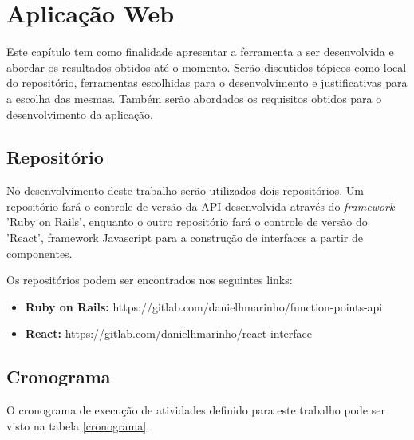 \chapter[Aplicação Web]{Aplicação Web}

Este capítulo tem como finalidade apresentar a ferramenta a ser desenvolvida e abordar os resultados obtidos até o momento. Serão discutidos tópicos como local do repositório, ferramentas escolhidas para o desenvolvimento e justificativas para a escolha das mesmas. Também serão abordados os requisitos obtidos para o desenvolvimento da aplicação.



\section{Repositório}

No desenvolvimento deste trabalho serão utilizados dois repositórios. Um repositório fará o controle de versão da API desenvolvida através do \textit{framework} 'Ruby on Rails', enquanto o outro repositório fará o controle de versão do 'React', framework Javascript  para a construção de interfaces a partir de componentes.

Os repositórios podem ser encontrados nos seguintes links:

\begin{itemize}

\item \textbf{Ruby on Rails:}
https://gitlab.com/danielhmarinho/function-points-api

\item \textbf{React:} https://gitlab.com/danielhmarinho/react-interface

\end{itemize}

\section{Cronograma}

O cronograma de execução de atividades definido para este trabalho pode ser visto na tabela \ref{cronograma}.

